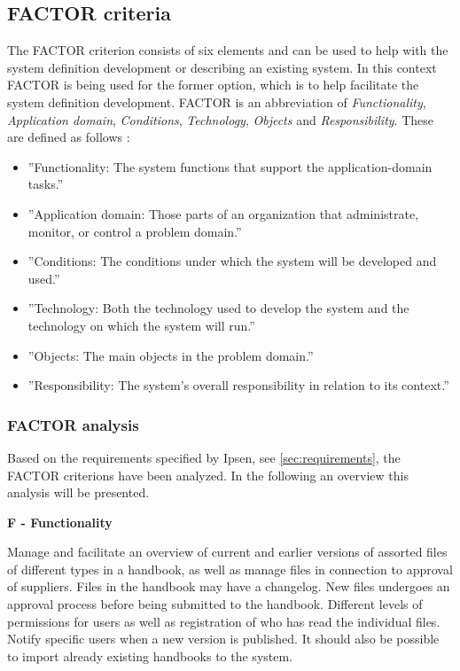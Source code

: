 \subsection{FACTOR criteria} \label{sec:factorcriteria}
The FACTOR criterion consists of six elements and can be used to help with the system definition development or describing an existing system.
In this context FACTOR is being used for the former option, which is to help facilitate the system definition development.
FACTOR is an abbreviation of \textit{Functionality}, \textit{Application domain}, \textit{Conditions}, \textit{Technology}, \textit{Objects} and \textit{Responsibility}.
These are defined as follows \citep[p.~40]{Rod-Aalborg}:
\begin{itemize}
	\item
		''Functionality:
		The system functions that support the application-domain tasks.''
	\item
		''Application domain:
		Those parts of an organization that administrate, monitor, or control a problem domain.''
	\item
		''Conditions:
		The conditions under which the system will be developed and used.''
	\item
		''Technology:
		Both the technology used to develop the system and the technology on which the system will run.''
	\item
		''Objects:
		The main objects in the problem domain.''
	\item
		''Responsibility:
		The system’s overall responsibility in relation to its context.''
\end{itemize}

\subsubsection{FACTOR analysis}\label{factor}
Based on the requirements specified by Ipsen, see \cref{sec:requirements}, the FACTOR criterions have been analyzed.
In the following an overview this analysis will be presented.

\textbf{F - Functionality}

Manage and facilitate an overview of current and earlier versions of assorted files of different types in a handbook, as well as manage files in connection to approval of suppliers.
Files in the handbook may have a changelog.
New files undergoes an approval process before being submitted to the handbook.
Different levels of permissions for users as well as registration of who has read the individual files.
Notify specific users when a new version is published.
It should also be possible to import already existing handbooks to the system.

